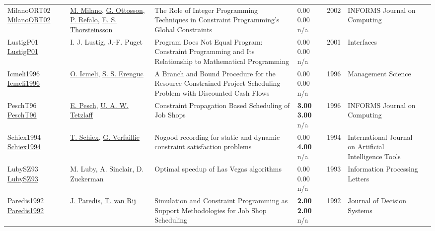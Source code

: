 {\begin{longtable}{p{3cm}p{5cm}p{10cm}p{1cm}rp{2.5cm}l}
MilanoORT02 \href{http://dx.doi.org/10.1287/ijoc.14.4.387.2830}{MilanoORT02} & \hyperref[auth:a143]{M. Milano}, \hyperref[auth:a851]{G. Ottosson}, \hyperref[auth:a254]{P. Refalo}, \hyperref[auth:a873]{E. S. Thorsteinsson} & The Role of Integer Programming Techniques in Constraint Programming's Global Constraints & \noindent{}\textcolor{black!50}{0.00} \textcolor{black!50}{0.00} n/a & 2002 & \cellcolor{red!20}INFORMS Journal on Computing & \cite{MilanoORT02}\\
LustigP01 \href{http://dx.doi.org/10.1287/inte.31.6.29.9647}{LustigP01} & I. J. Lustig, J.-F. Puget & Program Does Not Equal Program: Constraint Programming and Its Relationship to Mathematical Programming & \noindent{}\textcolor{black!50}{0.00} \textcolor{black!50}{0.00} n/a & 2001 & \cellcolor{red!20}Interfaces & \cite{LustigP01}\\
Icmeli1996 \href{http://dx.doi.org/10.1287/mnsc.42.10.1395}{Icmeli1996} & \hyperref[auth:a1551]{O. Icmeli}, \hyperref[auth:a1552]{S. S. Erenguc} & A Branch and Bound Procedure for the Resource Constrained Project Scheduling Problem with Discounted Cash Flows & \noindent{}\textcolor{black!50}{0.00} \textcolor{black!50}{0.00} n/a & 1996 & Management Science & \cite{Icmeli1996}\\
PeschT96 \href{http://dx.doi.org/10.1287/ijoc.8.2.144}{PeschT96} & \hyperref[auth:a437]{E. Pesch}, \hyperref[auth:a1215]{U. A. W. Tetzlaff} & Constraint Propagation Based Scheduling of Job Shops & \noindent{}\textbf{3.00} \textbf{3.00} n/a & 1996 & \cellcolor{red!20}INFORMS Journal on Computing & \cite{PeschT96}\\
Schiex1994 \href{http://dx.doi.org/10.1142/s0218213094000108}{Schiex1994} & \hyperref[auth:a1718]{T. Schiex}, \hyperref[auth:a1719]{G. Verfaillie} & Nogood recording for static and dynamic constraint satisfaction problems & \noindent{}\textcolor{black!50}{0.00} \textbf{4.00} n/a & 1994 & International Journal on Artificial Intelligence Tools & \cite{Schiex1994}\\
LubySZ93 \href{http://dx.doi.org/10.1016/0020-0190(93)90029-9}{LubySZ93} & M. Luby, A. Sinclair, D. Zuckerman & Optimal speedup of Las Vegas algorithms & \noindent{}\textcolor{black!50}{0.00} \textcolor{black!50}{0.00} n/a & 1993 & Information Processing Letters & \cite{LubySZ93}\\
Paredis1992 \href{http://dx.doi.org/10.1080/12460125.1992.10511509}{Paredis1992} & \hyperref[auth:a1995]{J. Paredis}, \hyperref[auth:a1996]{T. van Rij} & Simulation and Constraint Programming as Support Methodologies for Job Shop Scheduling & \noindent{}\textbf{2.00} \textbf{2.00} n/a & 1992 & Journal of Decision Systems & \cite{Paredis1992}\\

\end{longtable}}
